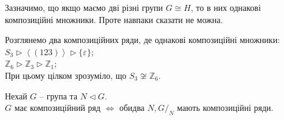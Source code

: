 \documentclass{math_library}
\begin{document}
\begin{remark}
Зазначимо, що якщо маємо дві різні групи $G \cong H$, то в них однакові композиційні множники. Проте навпаки сказати не можна.
\end{remark}

\begin{example}
Розглянемо два композиційних ряди, де однакові композиційні множники:\\
$S_3 \triangleright \left< (123) \right> \triangleright \{\varepsilon\}$;\\
$\mathbb{Z}_6 \triangleright \mathbb{Z}_3 \triangleright \mathbb{Z}_1$;\\
При цьому цілком зрозуміло, що $S_3 \not\cong \mathbb{Z}_6$.
\end{example}

\begin{proposition}
Нехай $G$ -- група та $N \triangleleft G$.\\
$G$ має композиційний ряд $\iff$ обидва $N,G/_N$ мають композиційні ряди.
\end{proposition}
\end{document}
